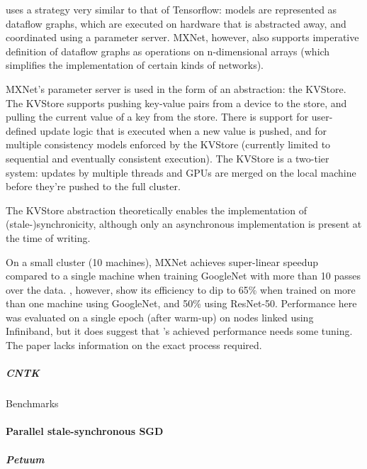 uses a strategy very similar to that of Tensorflow: models are represented as dataflow graphs, which are executed on hardware that is abstracted away, and coordinated using a parameter server. MXNet, however, also supports imperative definition of dataflow graphs as operations on n-dimensional arrays (which simplifies the implementation of certain kinds of networks).

MXNet's parameter server is used in the form of an abstraction: the KVStore. The KVStore supports pushing key-value pairs from a device to the store, and pulling the current value of a key from the store. There is support for user-defined update logic that is executed when a new value is pushed, and for multiple consistency models enforced by the KVStore (currently limited to sequential and eventually consistent execution). The KVStore is a two-tier system: updates by multiple threads and GPUs are merged on the local machine before they're pushed to the full cluster.

The KVStore abstraction theoretically enables the implementation of (stale-)synchronicity, although only an asynchronous implementation is present at the time of writing. 

On a small cluster (10 machines), MXNet achieves super-linear speedup compared to a single machine when training GoogleNet\citep{Szegedy2014} with more than 10 passes over the data. \citet{Shaohuai2017}, however, show its efficiency to dip to 65\% when trained on more than one machine using GoogleNet\citep{Szegedy2014}, and 50\% using ResNet-50\citet{He2015}. Performance here was evaluated on a single epoch (after warm-up) on nodes linked using Infiniband, but it does suggest that \citet{MXNet2015}'s achieved performance needs some tuning. The paper lacks information on the exact process required.

\subparagraph{CNTK}

Benchmarks

\paragraph{Parallel stale-synchronous SGD}

\subparagraph{Petuum \citep{Xing2013}}

